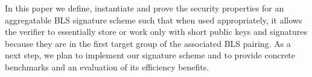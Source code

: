 \vspace{-0.01in}
\noindent In this paper we define, instantiate and prove the security properties for an aggregatable BLS signature 
scheme such that when used appropriately, it allows the verifier to essentially store or work only with short public keys 
and signatures because they are in the first target group of the associated BLS pairing. As a next step, we plan to implement 
our signature scheme and to provide concrete benchmarks and an evaluation of its efficiency benefits. 
